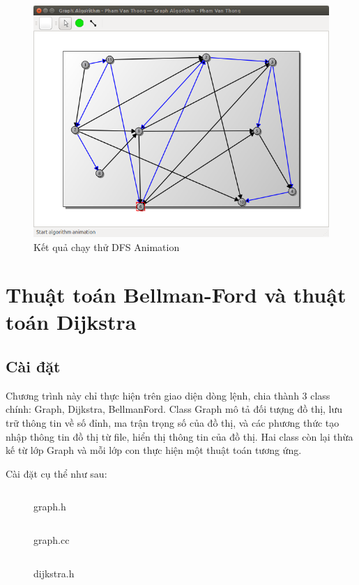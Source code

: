 \documentclass[a4paper,10pt]{article}
\newcommand{\mnt}[1]{\inputminted[frame=single, linenos=true, tabsize=4]{c++}{#1}}
\begin{document}
\begin{figure}[h!]
  \centering
  \includegraphics[scale=0.5]{images/pic7.png}
  \caption{Kết quả chạy thử DFS Animation}
\end{figure}

\newpage
\section{Thuật toán Bellman-Ford và thuật toán Dijkstra}
\subsection{Cài đặt}
Chương trình này chỉ thực hiện trên giao diện dòng lệnh, chia thành 3 class chính: Graph, Dijkstra, BellmanFord. Class Graph mô tả đối tượng đồ thị, lưu trữ thông tin về số đỉnh, ma trận trọng số của đồ thị, và các phương thức tạo nhập thông tin đồ thị từ file, hiển thị thông tin của đồ thị. Hai class còn lại thừa kế từ lớp Graph và mỗi lớp con thực hiện một thuật toán tương ứng.

Cài đặt cụ thể như sau:
\begin{figure}[h!]
  \centering
  \mnt{images/graph.h}
  \caption{graph.h}
\end{figure}


\begin{figure}[h!]
  \centering
  \mnt{images/graph.cc}
  \caption{graph.cc}
\end{figure}

\begin{figure}[h!]
  \centering
  \mnt{images/dijkstra.h}
  \caption{dijkstra.h}
\end{figure}
\end{document}

